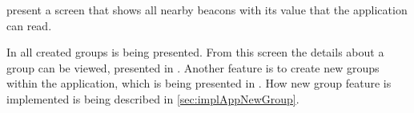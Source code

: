 \bigskip

 present a screen that shows all nearby beacons with its value that the application can read.

\bigskip

In  all created groups is being presented.
From this screen the details about a group can be viewed, presented in .
Another feature is to create new groups within the application, which is being presented in .
How new group feature is implemented is being described in \cref{sec:implAppNewGroup}.
